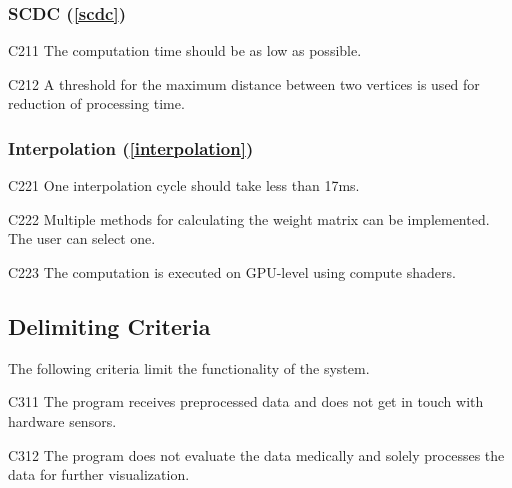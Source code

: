 \subsubsection[SCDC]{SCDC (\ref{scdc})}
	
	\begin{aims}
		
		\item[C211] The computation time should be as low as possible.
		\item[C212] A threshold for the maximum distance between two vertices is used for reduction of processing time.
		
	\end{aims}
	
\subsubsection[Interpolation]{Interpolation (\ref{interpolation})}

	\begin{aims}
	
		\item[C221] One interpolation cycle should take less than 17ms.
		\item[C222] Multiple methods for calculating the weight matrix can be implemented. The user can select one.
		\item[C223] The computation is executed on GPU-level using compute shaders.
	
	\end{aims}
	
	
\subsection{Delimiting Criteria} 
	
	The following criteria limit the functionality of the system.
	
	\begin{aims}
		
		\item[C311] The program receives preprocessed data and does not get in touch with hardware sensors.
		\item[C312] The program does not evaluate the data medically and solely processes the data for further 										visualization. 						
		
	\end{aims}
	



	
